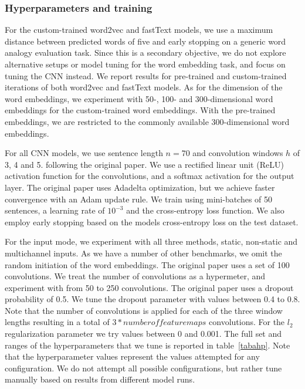 \documentclass[conference]{IEEEtran}
\begin{document}
\subsubsection{Hyperparameters and training}
 For the custom-trained word2vec and fastText models, we use a maximum distance between predicted words of five and early stopping on a generic word analogy evaluation task. Since this is a secondary objective, we do not explore alternative setups or model tuning for the word embedding task, and focus on tuning the CNN instead. We report results for pre-trained and custom-trained iterations of both word2vec and fastText models. As for the dimension of the word embeddings, we experiment with 50-, 100- and 300-dimensional word embeddings for the custom-trained word embeddings. With the pre-trained embeddings, we are restricted to the commonly available 300-dimensional word embeddings. 

For all CNN models, we use sentence length $n = 70$ and convolution windows $h$ of 3, 4 and 5.  following the original paper. We use a rectified linear unit (ReLU) activation function for the convolutions, and a softmax activation for the output layer. The original paper uses Adadelta \cite{adadelta} optimization, but we achieve faster convergence with an Adam \cite{adam} update rule. We train using mini-batches of 50 sentences, a learning rate of $10^{-3}$ and the cross-entropy loss function. We also employ early stopping based on the models cross-entropy loss on the test dataset.

For the input mode, we experiment with all three methods, static, non-static and multichannel inputs. As we have a number of other benchmarks, we omit the random initiation of the word embeddings.  The original paper uses a set of 100 convolutions. We treat the number of convolutions as a hypermeter, and experiment with from 50 to 250 convolutions. The original paper uses a dropout probability of 0.5. We tune the dropout parameter with values between 0.4 to 0.8. Note that the number of convolutions is applied for each of the three window lengths resulting in a total of $3 * number of feature maps$ convolutions. For the $l_2$ regularization parameter we try values between 0 and 0.001. The full set and ranges of the hyperparameters that we tune is reported in table~\ref{tabahp}. Note that the hyperparameter values represent the values attempted for any configuration. We do not attempt all possible configurations, but rather tune manually based on results from different model runs.
\end{document}
